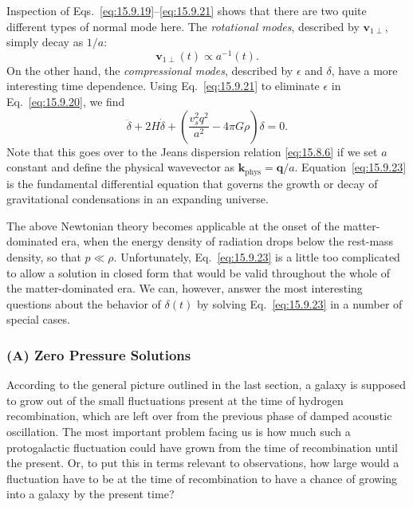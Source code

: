 Inspection of Eqs.~\eqref{eq:15.9.19}--\eqref{eq:15.9.21} shows that
there are two quite different types of normal mode here. The \emph{rotational
modes}, described by \(\mathbf v_{1\perp}\), simply decay as \(1/a\):
\begin{equation}
  \mathbf v_{1\perp}(t)\propto a^{-1}(t).
  \tag{15.9.22}\label{eq:15.9.22}
\end{equation}
On the other hand, the \emph{compressional modes}, described by
\(\epsilon\) and \(\delta\), have a more interesting time dependence. Using
Eq.~\eqref{eq:15.9.21} to eliminate \(\epsilon\) in
Eq.~\eqref{eq:15.9.20}, we find
\begin{equation}
  \ddot\delta
  +2H\dot\delta
  +\left(
    \frac{v_s^2q^2}{a^2}-4\pi G\rho
  \right)\delta
  =0.
  \tag{15.9.23}\label{eq:15.9.23}
\end{equation}
Note that this goes over to the Jeans dispersion relation \eqref{eq:15.8.6}
if we set \(a\) constant and define the physical wavevector as
\(\mathbf{k}_{\mathrm{phys}}=\mathbf q/a\).
Equation~\eqref{eq:15.9.23} is the fundamental differential equation that
governs the growth or decay of gravitational condensations in an expanding
universe.

The above Newtonian theory becomes applicable at the onset of the
matter-dominated era, when the energy density of radiation drops below the
rest-mass density, so that \(p\ll\rho\). Unfortunately,
Eq.~\eqref{eq:15.9.23} is a little too complicated to allow a solution in
closed form that would be valid throughout the whole of the matter-dominated
era. We can, however, answer the most interesting questions about the behavior
of \(\delta(t)\) by solving Eq.~\eqref{eq:15.9.23} in a number of special
cases.

\subsubsection*{(A) Zero Pressure Solutions}

According to the general picture outlined in the last section, a galaxy is
supposed to grow out of the small fluctuations present at the time of hydrogen
recombination, which are left over from the previous phase of damped acoustic
oscillation. The most important problem facing us is how much such a
protogalactic fluctuation could have grown from the time of recombination until
the present. Or, to put this in terms relevant to observations, how large would
a fluctuation have to be at the time of recombination to have a chance of
growing into a galaxy by the present time?


